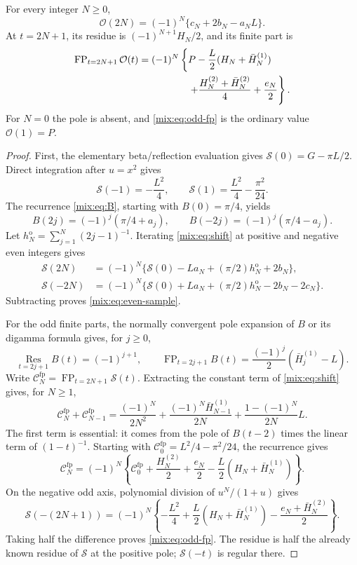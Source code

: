 \begin{theorem}
\label{mix:thm:integer}
For every integer $N\ge0$,
\begin{equation}\label{mix:eq:even-sample}
 \boxed{\quad
 \mathcal O(2N)=(-1)^N\{c_N+2b_N-a_NL\}.
 \quad}
\end{equation}
At $t=2N+1$, its residue is
$(-1)^{N+1}H_N/2$, and its finite part is
\begin{align}
 \operatorname{FP}_{t=2N+1}\mathcal O(t)
 ={}&(-1)^N\left\{
 P-\frac L2(H_N+\bar H_N^{(1)})\right.\notag\\
 &\left.\hspace{13mm}
 +\frac{H_N^{(2)}+\bar H_N^{(2)}}4+\frac{e_N}2
 \right\}.
 \label{mix:eq:odd-fp}
\end{align}
For $N=0$ the pole is absent, and \eqref{mix:eq:odd-fp} is the
ordinary value $\mathcal O(1)=P$.
\end{theorem}
\begin{proof}
First, the elementary beta/reflection evaluation gives
$\mathcal S(0)=G-\pi L/2$. Direct integration after $u=x^2$ gives
\[
 \mathcal S(-1)=-\frac{L^2}4,\qquad
 \mathcal S(1)=\frac{L^2}4-\frac{\pi^2}{24}.
\]
The recurrence \eqref{mix:eq:B}, starting with $B(0)=\pi/4$, yields
\[
 B(2j)=(-1)^j(\pi/4+a_j),\qquad
 B(-2j)=(-1)^j(\pi/4-a_j).
\]
Let $h_N^{\mathrm o}=\sum_{j=1}^N(2j-1)^{-1}$. Iterating
\eqref{mix:eq:shift} at positive and negative even integers gives
\begin{align*}
 \mathcal S(2N)&=(-1)^N\{
 \mathcal S(0)-La_N+(\pi/2)h_N^{\mathrm o}+2b_N\},\\
 \mathcal S(-2N)&=(-1)^N\{
 \mathcal S(0)+La_N+(\pi/2)h_N^{\mathrm o}-2b_N-2c_N\}.
\end{align*}
Subtracting proves \eqref{mix:eq:even-sample}.

For the odd finite parts, the normally convergent pole expansion of $B$
or its digamma formula gives, for $j\ge0$,
\[
 \operatorname*{Res}_{t=2j+1}B(t)=(-1)^{j+1},\qquad
 \operatorname{FP}_{t=2j+1}B(t)
       =\frac{(-1)^j}{2}(\bar H_j^{(1)}-L).
\]
Write $\mathcal C_N^{\mathrm{fp}}=\operatorname{FP}_{t=2N+1}\mathcal S(t)$.
Extracting the
constant term of \eqref{mix:eq:shift} gives, for $N\ge1$,
\[
 \mathcal C_N^{\mathrm{fp}}+\mathcal C_{N-1}^{\mathrm{fp}}
 =\frac{(-1)^N}{2N^2}
  +\frac{(-1)^N\bar H_{N-1}^{(1)}}{2N}
  +\frac{1-(-1)^N}{2N}L.
\]
The first term is essential: it comes from the pole of $B(t-2)$ times
the linear term of $(1-t)^{-1}$.
Starting with $\mathcal C_0^{\mathrm{fp}}=L^2/4-\pi^2/24$,
the recurrence gives
\[
 \mathcal C_N^{\mathrm{fp}}=(-1)^N\left\{
 \mathcal C_0^{\mathrm{fp}}+\frac{H_N^{(2)}}2+\frac{e_N}2
       -\frac L2(H_N+\bar H_N^{(1)})\right\}.
\]
On the negative odd axis, polynomial division of $u^N/(1+u)$ gives
\[
 \mathcal S(-(2N+1))=(-1)^N\left\{
 -\frac{L^2}4+\frac L2(H_N+\bar H_N^{(1)})
       -\frac{e_N+\bar H_N^{(2)}}2\right\}.
\]
Taking half the difference proves \eqref{mix:eq:odd-fp}.
The residue is half the already known residue of $\mathcal S$ at the
positive pole; $\mathcal S(-t)$ is regular there.
\end{proof}

